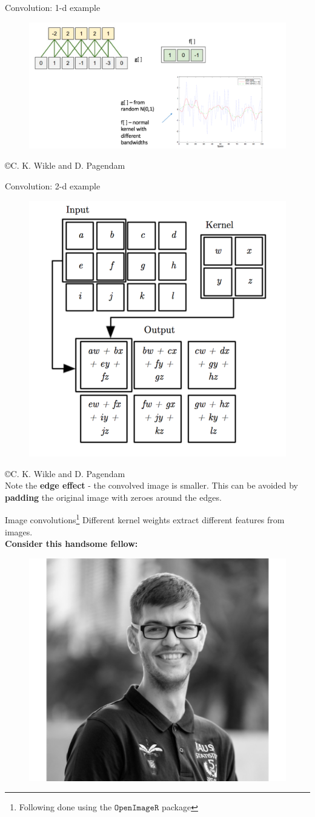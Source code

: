 \documentclass{beamer}
\begin{document}
\begin{frame}{Convolution: 1-d example}
\begin{figure}
\includegraphics[width=\textwidth]{Images/1dconv.png}
\end{figure}
\centering \copyright C. K. Wikle and D. Pagendam
\end{frame}
\begin{frame}{Convolution: 2-d example}
\begin{figure}
\includegraphics[width=0.45\linewidth]{Images/2dconv.png}
\end{figure}
\centering \copyright C. K. Wikle and D. Pagendam \\
Note the \textbf{edge effect} - the convolved image is smaller. This can be avoided by \textbf{padding} the original image with zeroes around the edges.
\end{frame}

\begin{frame}{Image convolutions\footnote{Following done using the $\texttt{OpenImageR}$ package}}
Different kernel weights extract different features from images.\\
\textbf{Consider this handsome fellow:}
\begin{figure}
\includegraphics[width=0.45\linewidth]{Images/conv1.png}
\end{figure}
\end{frame}
\end{document}
